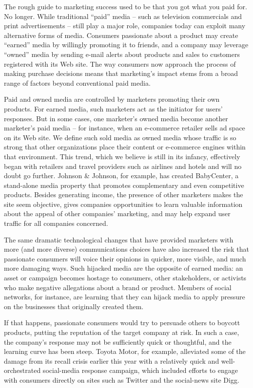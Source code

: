 The rough guide to marketing success used to be that you got what you paid for. No longer. While traditional ``paid'' media – such as television commercials and print advertisements – still play a major role, companies today can exploit many alternative forms of media. Consumers passionate about a product may create ``earned'' media by willingly promoting it to friends, and a company may leverage ``owned'' media by sending e-mail alerts about products and sales to customers registered with its Web site. The way consumers now approach the process of making purchase decisions means that marketing's impact stems from a broad range of factors beyond conventional paid media.


Paid and owned media are controlled by marketers promoting their own products. For earned media, such marketers act as the initiator for users' responses. But in some cases, one marketer's owned media become another marketer's paid media – for instance, when an e-commerce retailer sells ad space on its Web site. We define such sold media as owned media whose traffic is so strong that other organizations place their content or e-commerce engines within that environment. This trend, which we believe is still in its infancy, effectively began with retailers and travel providers such as airlines and hotels and will no doubt go further. Johnson \& Johnson, for example, has created BabyCenter, a stand-alone media property that promotes complementary and even competitive products. Besides generating income, the presence of other marketers makes the site seem objective, gives companies opportunities to learn valuable information about the appeal of other companies' marketing, and may help expand user traffic for all companies concerned.


The same dramatic technological changes that have provided marketers with more (and more diverse) communications choices have also increased the risk that passionate consumers will voice their opinions in quicker, more visible, and much more damaging ways. Such hijacked media are the opposite of earned media: an asset or campaign becomes hostage to consumers, other stakeholders, or activists who make negative allegations about a brand or product. Members of social networks, for instance, are learning that they can hijack media to apply pressure on the businesses that originally created them.


If that happens, passionate consumers would try to persuade others to boycott products, putting the reputation of the target company at risk. In such a case, the company's response may not be sufficiently quick or thoughtful, and the learning curve has been steep. Toyota Motor, for example, alleviated some of the damage from its recall crisis earlier this year with a relatively quick and well-orchestrated social-media response campaign, which included efforts to engage with consumers directly on sites such as Twitter and the social-news site Digg.